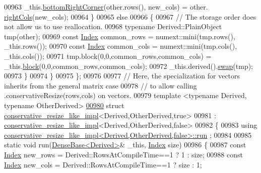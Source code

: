 \begin{DoxyCode}
00963         \_this.\hyperlink{group___core___module_a6cdf27f6b825097f86fc6bcdbeed9e65}{bottomRightCorner}(other.rows(), new\_cols) = other.
      \hyperlink{group___core___module_a5b0fa44c191d40a2f82260f7e5cdeaa9}{rightCols}(new\_cols);
00964     \}
00965     \textcolor{keywordflow}{else}
00966     \{
00967       \textcolor{comment}{// The storage order does not allow us to use reallocation.}
00968       \textcolor{keyword}{typename} Derived::PlainObject tmp(other);
00969       \textcolor{keyword}{const} \hyperlink{namespace_eigen_a62e77e0933482dafde8fe197d9a2cfde}{Index} common\_rows = numext::mini(tmp.rows(), \_this.rows());
00970       \textcolor{keyword}{const} \hyperlink{namespace_eigen_a62e77e0933482dafde8fe197d9a2cfde}{Index} common\_cols = numext::mini(tmp.cols(), \_this.cols());
00971       tmp.block(0,0,common\_rows,common\_cols) = \_this.\hyperlink{group___core___module_ab8e42e67c5cfd5fa13e684642f0f65bf}{block}(0,0,common\_rows,common\_cols);
00972       \_this.derived().\hyperlink{group___core___module_ab420d9d588ac443f5a1b1a7dceb12c90}{swap}(tmp);
00973     \}
00974   \}
00975 \};
00976 
00977 \textcolor{comment}{// Here, the specialization for vectors inherits from the general matrix case}
00978 \textcolor{comment}{// to allow calling .conservativeResize(rows,cols) on vectors.}
00979 \textcolor{keyword}{template} <\textcolor{keyword}{typename} Derived, \textcolor{keyword}{typename} OtherDerived>
\hyperlink{struct_eigen_1_1internal_1_1conservative__resize__like__impl_3_01_derived_00_01_other_derived_00_01true_01_4}{00980} \textcolor{keyword}{struct }\hyperlink{struct_eigen_1_1internal_1_1conservative__resize__like__impl}{conservative\_resize\_like\_impl}<Derived,OtherDerived,true>
00981   : \hyperlink{struct_eigen_1_1internal_1_1conservative__resize__like__impl}{conservative\_resize\_like\_impl}<Derived,OtherDerived,false>
00982 \{
00983   \textcolor{keyword}{using} \hyperlink{struct_eigen_1_1internal_1_1conservative__resize__like__impl}{conservative\_resize\_like\_impl<Derived,OtherDerived,false>::run}
      ;
00984   
00985   \textcolor{keyword}{static} \textcolor{keywordtype}{void} run(\hyperlink{group___core___module_class_eigen_1_1_dense_base}{DenseBase<Derived>}& \_this, \hyperlink{namespace_eigen_a62e77e0933482dafde8fe197d9a2cfde}{Index} size)
00986   \{
00987     \textcolor{keyword}{const} \hyperlink{namespace_eigen_a62e77e0933482dafde8fe197d9a2cfde}{Index} new\_rows = Derived::RowsAtCompileTime==1 ? 1 : size;
00988     \textcolor{keyword}{const} \hyperlink{namespace_eigen_a62e77e0933482dafde8fe197d9a2cfde}{Index} new\_cols = Derived::RowsAtCompileTime==1 ? size : 1;

\end{DoxyCode}
